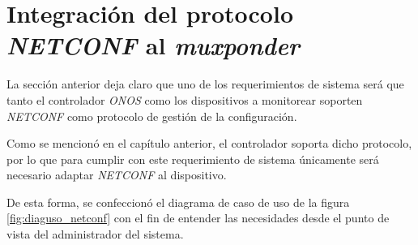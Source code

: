 \newpage

  \section{Integración del protocolo \textit{NETCONF} al \textit{muxponder}}
  La sección anterior deja claro que uno de los requerimientos de sistema será que tanto el controlador \textit{ONOS} como los dispositivos a monitorear soporten \textit{NETCONF} como protocolo de gestión de la configuración. 
  
  Como se mencionó en el capítulo anterior, el controlador soporta dicho protocolo, por lo que para cumplir con este requerimiento de sistema únicamente será necesario adaptar \textit{NETCONF} al dispositivo. 

  De esta forma, se confeccionó el diagrama de caso de uso de la figura \ref{fig:diaguso_netconf} con el fin de entender las necesidades desde el punto de vista del administrador del sistema. 

